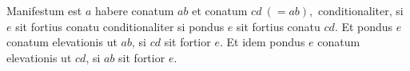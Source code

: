 \pend
\count{}
\count{}
\count{}
\pstart%
Manifestum est $a$ habere conatum $ab$ et  conatum $cd\ (= ab),$ conditionaliter, si  $e$ sit fortius conatu  conditionaliter si pondus $e$ sit fortius conatu $cd$.
Et pondus $e$ conatum elevationis\protect{} ut $ab$, si $cd$ sit fortior $e$.
Et idem pondus $e$ conatum elevationis ut $cd$, si $ab$ sit fortior $e$.
